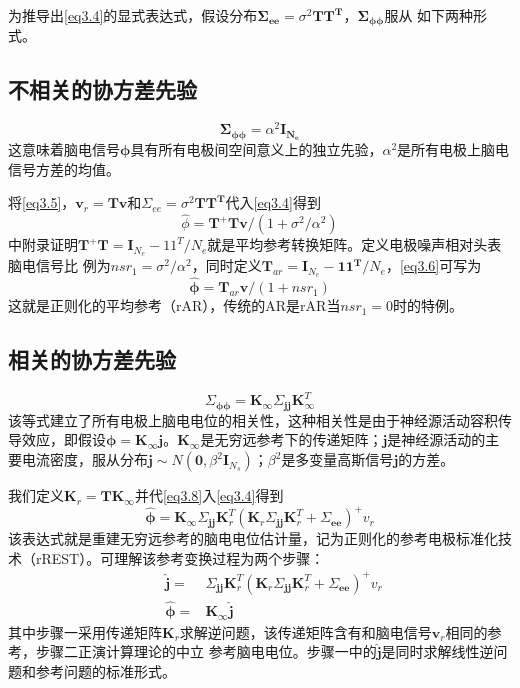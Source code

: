 为推导出\eqref{eq3.4}的显式表达式，假设分布$\mathbf{\Sigma_{ee}}=\sigma^{2}\mathbf{TT^T}$，$\mathbf{\Sigma_{\phi\phi}}$服从
如下两种形式。
\subsection{不相关的协方差先验}
\begin{equation}\label{eq3.5}
\mathbf{\Sigma_{\phi\phi}}=\alpha^{2}\mathbf{I_{N_{e}}}
\end{equation}
这意味着脑电信号$\mathbf{\phi}$具有所有电极间空间意义上的独立先验，$\alpha^2$是所有电极上脑电信号方差的均值。

将\eqref{eq3.5}，$\mathbf{v}_{r}=\mathbf{Tv}$和$\Sigma_{ee}=\sigma^{2}\mathbf{TT^{T}}$代入\eqref{eq3.4}得到
\begin{equation}\label{eq3.6}
\hat{\phi}=\mathbf{T^{+}Tv}/(1+\sigma^{2}/{\alpha^{2}})
\end{equation}
\cite{hu_unified_2018}中附录证明$\mathbf{T^+T}=\mathbf{I}_{N_e}-11^T/N_e$就是平均参考转换矩阵。定义电极噪声相对头表脑电信号比
例为$nsr_1=\sigma^2/\alpha^2$，同时定义$\mathbf{T}_{ar}=\mathbf{I}_{N_e}-\mathbf{11^T}/{N_e}$，\eqref{eq3.6}可写为
\begin{equation}\label{eq3.7}
\hat{\mathbf{\phi}}=\mathbf{T}_{ar}\mathbf{v}/(1+nsr_1)
\end{equation}
这就是正则化的平均参考（rAR），传统的AR是rAR当$nsr_1=0$时的特例。
\subsection{相关的协方差先验}
\begin{equation}\label{eq3.8}
\Sigma_{\mathbf{\phi\phi}}=\mathbf{K}_{\infty}\Sigma_{\mathbf{jj}}\mathbf{K}_{\infty}^T
\end{equation}
该等式建立了所有电极上脑电电位的相关性，这种相关性是由于神经源活动容积传导效应，即假设$\mathbf{\phi}=\mathbf{K}_{\infty}\mathbf{j}$。$\mathbf{K}_\infty$是无穷远参考下的传递矩阵；$\mathbf{j}$是神经源活动的主要电流密度，服从分布$\mathbf{j}\sim{N(\mathbf{0},\beta^2\mathbf{I}_{N_s})}$；$\beta^{2}$是多变量高斯信号$\mathbf{j}$的方差。

我们定义$\mathbf{K}_{r}=\mathbf{TK}_{\infty}$并代\eqref{eq3.8}入\eqref{eq3.4}得到
\begin{equation}\label{eq3.9}
\hat{\mathbf{\phi}}=\mathbf{K}_\infty\Sigma_{\mathbf{jj}}\mathbf{K}_r^T(\mathbf{K}_r\Sigma_{\mathbf{jj}}\mathbf{K}_r^T+\Sigma_{\mathbf{ee}})^+v_r
\end{equation}
该表达式就是重建无穷远参考的脑电电位估计量，记为正则化的参考电极标准化技术（rREST）。可理解该参考变换过程为两个步骤：
\begin{align*}
\qquad\hat{\mathbf{j}}={} &\Sigma_{\mathbf{jj}}\mathbf{K}_{r}^T(\mathbf{K}_{r}\Sigma_{\mathbf{jj}}\mathbf{K}_r^T+\Sigma_{\mathbf{ee}})^+v_r\\
\qquad\hat{\mathbf{\phi}}={} &\mathbf{K}_{\infty}\hat{\mathbf{j}}
\end{align*}
其中步骤一采用传递矩阵$\mathbf{K}_{r}$求解逆问题，该传递矩阵含有和脑电信号$\mathbf{v}_{r}$相同的参考，步骤二正演计算理论的中立
参考脑电电位。步骤一中的$\hat{\mathbf{j}}$是同时求解线性逆问题和参考问题的标准形式。

